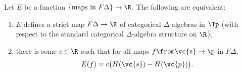 \begin{thm}
Let $E$ be a function $\{ \text{maps in } F\Delta \} \to \R$.  The
following are equivalent:
% 
\begin{enumerate}
\item
{}
$E$ defines a strict map $F\Delta \to \R$ of categorical $\Delta$-algebras
in $\Tp$ (with respect to the standard%
%
%
categorical $\Delta$-algebra structure on $\R$);

\item
{}
there is some $c \in \R$ such that for all maps $f \from \vc{s} \to \p$
in $F\Delta$,
\[
E(f)
= 
c\bigl(H(\vc{s}) - H(\vc{p})\bigr).
\]
\end{enumerate}
\end{thm}

